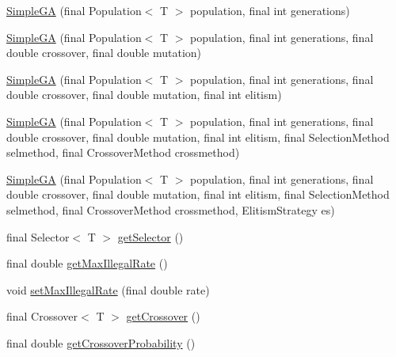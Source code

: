 \begin{DoxyCompactItemize}
\item 
\hyperlink{classjenes_1_1algorithms_1_1_simple_g_a_3_01_t_01extends_01_chromosome_01_4_ac26dcb81ef937ded77152a908ac55699}{Simple\-G\-A} (final Population$<$ T $>$ population, final int generations)
\item 
\hyperlink{classjenes_1_1algorithms_1_1_simple_g_a_3_01_t_01extends_01_chromosome_01_4_ad6c74ec603e7fbc1610f41ad9ee63981}{Simple\-G\-A} (final Population$<$ T $>$ population, final int generations, final double crossover, final double mutation)
\item 
\hyperlink{classjenes_1_1algorithms_1_1_simple_g_a_3_01_t_01extends_01_chromosome_01_4_a659f0192b24b5d8af22f73f190b67867}{Simple\-G\-A} (final Population$<$ T $>$ population, final int generations, final double crossover, final double mutation, final int elitism)
\item 
\hyperlink{classjenes_1_1algorithms_1_1_simple_g_a_3_01_t_01extends_01_chromosome_01_4_ac23644006d7eb399fd4d26e77da8826d}{Simple\-G\-A} (final Population$<$ T $>$ population, final int generations, final double crossover, final double mutation, final int elitism, final Selection\-Method selmethod, final Crossover\-Method crossmethod)
\item 
\hyperlink{classjenes_1_1algorithms_1_1_simple_g_a_3_01_t_01extends_01_chromosome_01_4_a068fcb44d18c3204fbb9b13daebd4f6d}{Simple\-G\-A} (final Population$<$ T $>$ population, final int generations, final double crossover, final double mutation, final int elitism, final Selection\-Method selmethod, final Crossover\-Method crossmethod, Elitism\-Strategy es)
\item 
final Selector$<$ T $>$ \hyperlink{classjenes_1_1algorithms_1_1_simple_g_a_3_01_t_01extends_01_chromosome_01_4_ac1b67ab65d05c07bd67aa8b072c965d7}{get\-Selector} ()
\item 
final double \hyperlink{classjenes_1_1algorithms_1_1_simple_g_a_3_01_t_01extends_01_chromosome_01_4_a6c450c770d9060faf01820a48491561a}{get\-Max\-Illegal\-Rate} ()
\item 
void \hyperlink{classjenes_1_1algorithms_1_1_simple_g_a_3_01_t_01extends_01_chromosome_01_4_a4051bc6ee99fe2450c9dbad64c7ab594}{set\-Max\-Illegal\-Rate} (final double rate)
\item 
final Crossover$<$ T $>$ \hyperlink{classjenes_1_1algorithms_1_1_simple_g_a_3_01_t_01extends_01_chromosome_01_4_a3411f8691495bdd8e3818f8ee6fcc181}{get\-Crossover} ()
\item 
final double \hyperlink{classjenes_1_1algorithms_1_1_simple_g_a_3_01_t_01extends_01_chromosome_01_4_a85ed250d10211b0faf798bef2663ec9f}{get\-Crossover\-Probability} ()

\end{DoxyCompactItemize}
